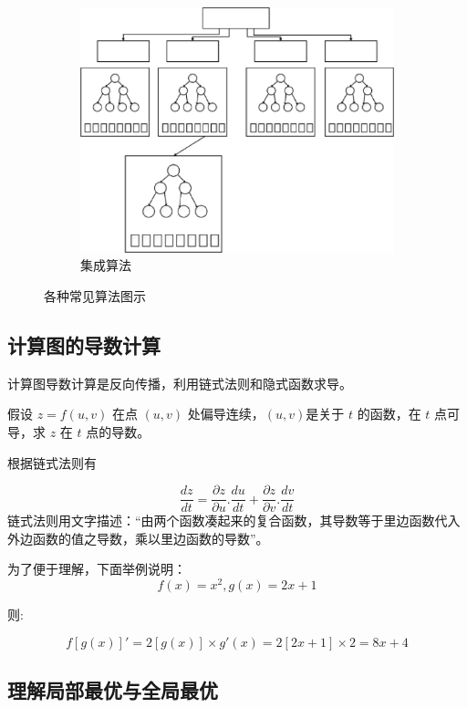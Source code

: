 \begin{figure}[htp]
\begin{subfigure}{.33\textwidth}
	   \includegraphics[width=\linewidth]{eps/2.2.12.eps}
	   \caption{集成算法}
	   \label{fig:2.sub.12}
	 \end{subfigure}\hfil %

	 \caption{各种常见算法图示}
	 \label{fig:2.2}

 \end{figure}

\subsection{计算图的导数计算}

计算图导数计算是反向传播，利用链式法则和隐式函数求导。

假设 $z = f(u,v)$ 在点 $(u,v)$ 处偏导连续，$(u,v)$是关于 $t$ 的函数，在 $t$ 点可导，求 $z$ 在 $t$ 点的导数。

根据链式法则有

$$
\frac{dz}{dt}=\frac{\partial z}{\partial u}.\frac{du}{dt}+\frac{\partial z}{\partial v} .\frac{dv}{dt}
$$
链式法则用文字描述：``由两个函数凑起来的复合函数，其导数等于里边函数代入外边函数的值之导数，乘以里边函数的导数''。

为了便于理解，下面举例说明：
$$
f(x)=x^2,g(x)=2x+1
$$

则:

$$
{f[g(x)]}'=2[g(x)] \times g'(x)=2[2x+1] \times 2=8x+4
$$

\subsection{理解局部最优与全局最优}

